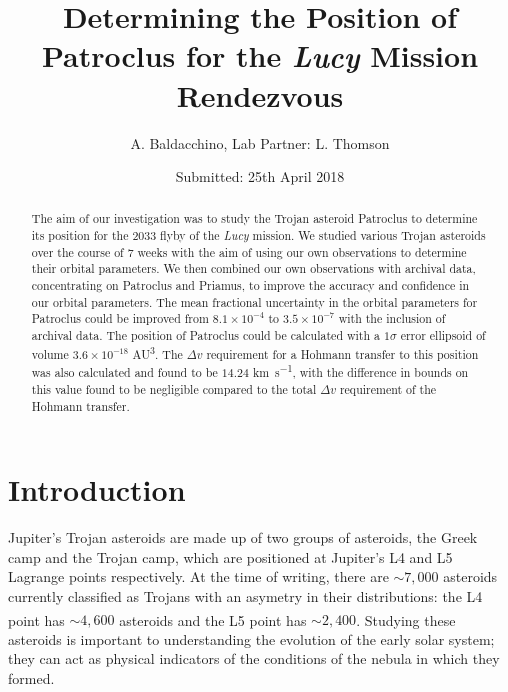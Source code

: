 \documentclass[10pt, twocolumn]{revtex4}    %
\begin{document}
                     

\title{Determining the Position of Patroclus for the \textit{Lucy} Mission Rendezvous} 
\date{Submitted: 25th April 2018}
\author{A. Baldacchino, Lab Partner: L. Thomson}

\begin{abstract}              

The aim of our investigation was to study the Trojan asteroid Patroclus to determine its position for the 2033 flyby of the \textit{Lucy} mission. We studied various Trojan asteroids over the course of 7 weeks with the aim of using our own observations to determine their orbital parameters. We then combined our own observations with archival data, concentrating on Patroclus and Priamus, to improve the accuracy and confidence in our orbital parameters. The mean fractional uncertainty in the orbital parameters for Patroclus could be improved from $8.1 \times 10^{-4}$ to $3.5 \times 10^{-7}$ with the inclusion of archival data. The position of Patroclus could be calculated with a $1\sigma$ error ellipsoid of volume $3.6 \times 10^{-18}$ \si{AU^{3}}. The $\Delta v$ requirement for a Hohmann transfer to this position was also calculated and found to be $14.24$ \si{\kilo\metre\per\second}, with the difference in bounds on this value found to be negligible compared to the total $\Delta v$ requirement of the Hohmann transfer. 

\end{abstract}

\maketitle
\thispagestyle{plain} %

\section{Introduction} 

Jupiter's Trojan asteroids are made up of two groups of asteroids, the Greek camp and the Trojan camp, which are positioned at Jupiter's L4 and L5 Lagrange points respectively. At the time of writing, there are ${\sim}7{,}000$ asteroids currently classified as Trojans with an asymetry in their distributions: the L4 point has ${\sim}4{,}600$ asteroids and the L5 point has ${\sim}2{,}400$.\textsuperscript{\cite{ListJupiterTrojans}} Studying these asteroids is important to understanding the evolution of the early solar system; they can act as physical indicators of the conditions of the nebula in which they formed.
\end{document}
